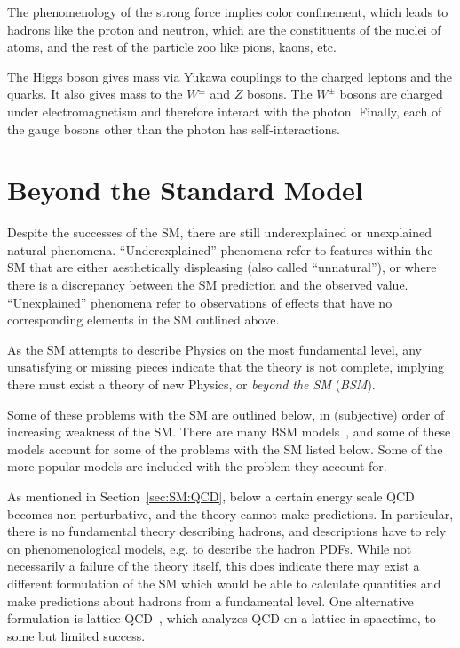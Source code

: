 The phenomenology of the strong force implies color confinement, which leads to hadrons like the proton and neutron, which are the constituents of the nuclei of atoms, and the rest of the particle zoo like pions, kaons, etc.

The Higgs boson gives mass via Yukawa couplings to the charged leptons and the quarks.
It also gives mass to the $W^\pm$ and $Z$ bosons.
The $W^\pm$ bosons are charged under electromagnetism and therefore interact with the photon.
Finally, each of the gauge bosons other than the photon has self-interactions.

\section{Beyond the Standard Model}
\label{sec:SM:BSM}
Despite the successes of the SM, there are still underexplained or unexplained natural phenomena.
``Underexplained'' phenomena refer to features within the SM that are either aesthetically displeasing (also called ``unnatural''), or where there is a discrepancy between the SM prediction and the observed value.
``Unexplained'' phenomena refer to observations of effects that have no corresponding elements in the SM outlined above.

As the SM attempts to describe Physics on the most fundamental level, any unsatisfying or missing pieces indicate that the theory is not complete, implying there must exist a theory of new Physics, or \textit{beyond the SM} (\textit{BSM}).

Some of these problems with the SM are outlined below, in (subjective) order of increasing weakness of the SM.
There are many BSM models~\cite{Lykken:2010mc,Lee:2019zbu,Ellis:2009pz,Ellis:2012zz,Virdee:2016,Halkiadakis:2014qda}, and some of these models account for some of the problems with the SM listed below.
Some of the more popular models are included with the problem they account for.

As mentioned in Section~\ref{sec:SM:QCD}, below a certain energy scale QCD becomes non-perturbative, and the theory cannot make predictions.
In particular, there is no fundamental theory describing hadrons, and descriptions have to rely on phenomenological models, e.g. to describe the hadron PDFs.
While not necessarily a failure of the theory itself, this does indicate there may exist a different formulation of the SM which would be able to calculate quantities and make predictions about hadrons from a fundamental level.
One alternative formulation is lattice QCD~\cite{Gupta:1997nd}, which analyzes QCD on a lattice in spacetime, to some but limited success.

